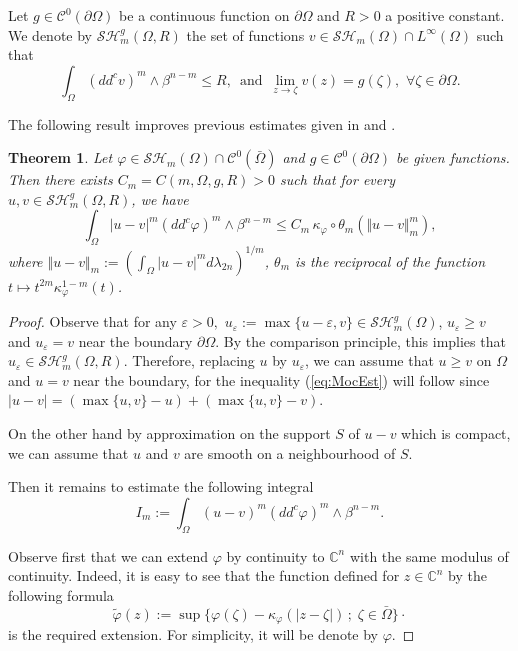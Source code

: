 \documentclass[12pt]{amsart}
\newtheorem{theorem}{Theorem}
\theoremstyle{definition}
\numberwithin{theorem}{section}
\numberwithin{equation}{section}
\newcommand{\C}{\mathbb{C}}
\begin{document}
 Let $g \in \mathcal{C}^0 (\partial \Omega)$ be a continuous function on  $\partial \Omega$ and $R > 0$ a positive constant. We denote by $\mathcal{SH}_m^g (\Omega,R)$ the set of functions $v \in \mathcal{SH}_m (\Omega) \cap L^{\infty} (\Omega)$ such that 
 $$
 \int_\Omega (dd^c v)^m \wedge  \beta^{n-m} \leq R, \,   \, \, \text{and} \, \, \, \lim_{z \to \zeta} v (z) = g (\zeta), \, \, \forall \zeta \in \partial \Omega.
 $${
The following result improves previous estimates given in \cite{N14} and \cite{BZ20}. 
 \begin{theorem}\label{thm:ModC}
Let $\varphi\in \mathcal{SH}_m(\Omega)\cap \mathcal{C}^{0} (\bar{\Omega})$ and $g \in \mathcal{C}^0 (\partial \Omega)$ be given functions.
Then  there exists $C_m  = C (m,\Omega,g, R) >0$   such that for every $u,v\in \mathcal{SH}^g_m(\Omega, R)$,
we have
\begin{equation} \label{eq:MocEst}
\int_{\Omega}|u-v|^m (dd^c\varphi)^m\wedge\beta^{n-m}\leq C_m \, \kappa_\varphi \circ \theta_m \left(\Vert u-v \Vert_m^{m}\right),
\end{equation}
where $\Vert u-v \Vert_m := \left(\int_{\Omega} \vert u - v\vert^m d \lambda_{2 n} \right)^{1 \slash m}$,  $\theta_m$ is the reciprocal of the function $t \longmapsto t^{2m} \kappa_{\varphi}^{1-m} (t)$.
\end{theorem}


\begin{proof}
Observe that for any $\varepsilon > 0,$ $ u_\varepsilon := \max \{u - \varepsilon, v \} \in \mathcal{SH}^g_m(\Omega)$, $u_\varepsilon \geq v$ and $u_\varepsilon = v$ near the boundary $\partial \Omega$. By the comparison principle, this implies that $u_\varepsilon \in  \mathcal{SH}^g_m(\Omega, R)$. Therefore, replacing $u$ by $u_\varepsilon$,  we can assume that $u \geq v$ on $\Omega$ and $u = v$ near the boundary, for the inequality (\ref{eq:MocEst}) will follow since $\vert u - v \vert =   ( \max\{u,v\} - u) + (\max\{u,v\}  - v)$.

On the other hand by approximation on the support $S$ of $u-v$ which is compact, we can assume that $u$ and $ v $ are smooth on a neighbourhood of $S$.

Then it remains to estimate the following integral
$$
I_m := \int_{\Omega} (u - v)^m  (dd^c\varphi)^m\wedge\beta^{n-m}.
$$

  
 Observe  first that we can extend $\varphi$ by continuity to $\C^n$ with the same modulus of continuity. Indeed, it is easy to see that the function defined  for $z \in \C^n$ by the following formula 
  $$
  \tilde{\varphi} (z) := \sup \{ \varphi (\zeta) - \kappa_\varphi (\vert z - \zeta\vert) \, ; \; \zeta \in \bar{\Omega}\}\cdot
  $$
  is the required extension.
 For simplicity, it will be denote  by $\varphi$.   
 

\end{proof}}
\end{document}
